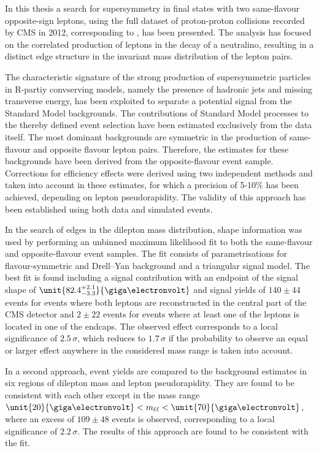 In this thesis a search for supersymmetry in final states with two same-flavour opposite-sign leptons, using the full dataset of proton-proton collisions recorded by CMS in 2012, corresponding to \lumi, has been presented. The analysis has focused on the correlated production of leptons in the decay of a neutralino, resulting in a distinct edge structure in the invariant mass distribution of the lepton pairs. 

The characteristic signature of the strong production of supersymmetric particles in R-partiy convserving models, namely the presence of hadronic jets and missing transverse energy, has been exploited to separate a potential signal from the Standard Model backgrounds. The contributions of Standard Model processes to the thereby defined event selection have been estimated exclusively from the data itself. The most dominant backgrounds are symmetric in the production of same-flavour and opposite flavour lepton pairs. Therefore, the estimates for these backgrounds have been derived from the opposite-flavour event sample. Corrections for efficiency effects were derived using two independent methods and taken into account in these estimates, for which a precision of 5-10\% has been achieved, depending on lepton pseudorapidity. The validity of this approach has been established using both data and simulated events. 

In the search of edges in the dilepton mass distribution, shape information was used by performing an unbinned maximum likelihood fit to both the same-flavour and opposite-flavour event samples. The fit consists of parametrisations for flavour-symmetric and Drell--Yan background and a triangular signal model. The best fit is found including a signal contribution with an endpoint of the signal shape of $\unit{82.4^{+2.1}_{-3.3}}{\giga\electronvolt}$ and signal yields of $140\pm44$ events for events where both leptons are reconstructed in the central part of the CMS detector and $2\pm22$ events for events where at least one of the leptons is located in one of the endcaps. The observed effect corresponds to a local significance of $2.5\,\sigma$, which reduces to $1.7\,\sigma$ if the probability to observe an equal or larger effect anywhere in the considered mass range is taken into account. 

In a second approach, event yields are compared to the background estimates in six regions of dilepton mass and lepton pseudorapidity. They are found to be consistent with each other except in the mass range $\unit{20}{\giga\electronvolt} < \mll < \unit{70}{\giga\electronvolt}$, where an excess of $109\pm48$ events is observed, corresponding to a local significance of $2.2\,\sigma$. The results of this approach are found to be consistent with the fit. 

